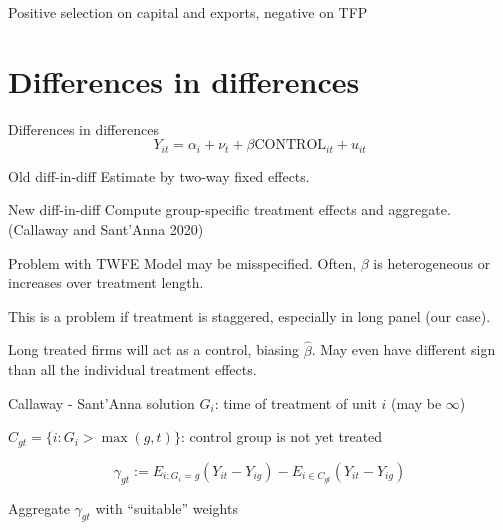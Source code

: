 \documentclass[
  ignorenonframetext,
  aspectratio=43,
]{beamer}
\begin{document}
\begin{frame}{Positive selection on capital and exports, negative on
TFP}
\protect\hypertarget{positive-selection-on-capital-and-exports-negative-on-tfp}{}

\end{frame}

\hypertarget{differences-in-differences}{%
\section{Differences in differences}\label{differences-in-differences}}

\begin{frame}{Differences in differences}
\protect\hypertarget{differences-in-differences-1}{}
\[
Y_{it} = \alpha_i + \nu_t + \beta \text{CONTROL}_{it} + u_{it}
\]

\begin{block}{Old diff-in-diff}
\protect\hypertarget{old-diff-in-diff}{}
Estimate by two-way fixed effects.
\end{block}

\begin{block}{New diff-in-diff}
\protect\hypertarget{new-diff-in-diff}{}
Compute group-specific treatment effects and aggregate. (Callaway and
Sant'Anna 2020)
\end{block}
\end{frame}

\begin{frame}{Problem with TWFE}
\protect\hypertarget{problem-with-twfe}{}
Model may be misspecified. Often, \(\beta\) is heterogeneous or
increases over treatment length.

This is a problem if treatment is staggered, especially in long panel
(our case).

Long treated firms will act as a control, biasing \(\hat\beta\). May
even have different sign than all the individual treatment effects.
\end{frame}

\begin{frame}{Callaway - Sant'Anna solution}
\protect\hypertarget{callaway---santanna-solution}{}
\(G_{i}\): time of treatment of unit \(i\) (may be \(\infty\))

\(C_{gt} = \{i: G_i > \max(g,t)\}\): control group is not yet treated

\[
\gamma_{gt} := E_{i: G_i=g} (Y_{it} - Y_{ig})
- E_{i\in C_{gt}} (Y_{it} - Y_{ig})
\]

Aggregate \(\gamma_{gt}\) with ``suitable'' weights
\end{frame}
\end{document}

